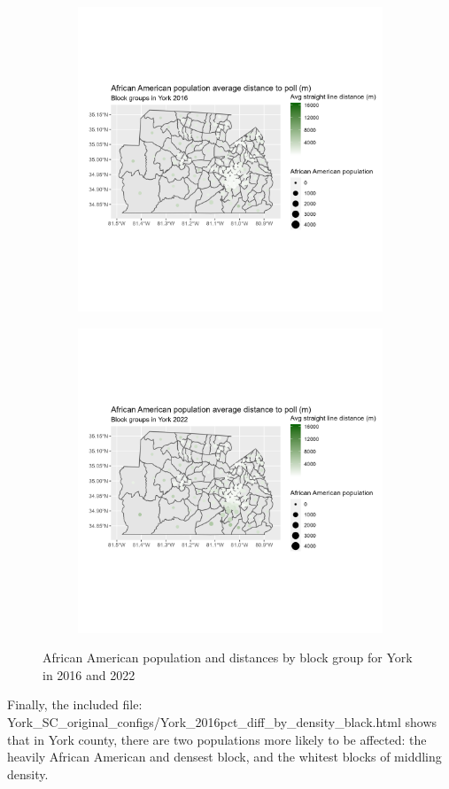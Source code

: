 \documentclass[11pt]{article}
\theoremstyle{remark}
\theoremstyle{definition}
\begin{document}
\begin{figure}
	\begin{subfigure}{.5\textwidth}
		\centering
		\includegraphics[width=\linewidth]{result_analysis/York_County_SC_original_configs/black_pop_and_dist_York_config_original_2016_polls.png}
		\label{sfig:York_2016_bg_dist_pop}
	\end{subfigure} 
	\begin{subfigure}{.5\textwidth}
		\centering
		\includegraphics[width=\linewidth]{result_analysis/York_County_SC_original_configs/black_pop_and_dist_York_config_original_2022_polls.png}
		\label{sfig:York_2022_bg_dist}
	\end{subfigure}
	\caption{African American population and distances by block group for York in 2016 and 2022}
	\label{fig:York distance Black population maps}
\end{figure}

Finally, the included file: \textrm{York\_SC\_original\_configs/York\_2016pct\_diff\_by\_density\_black.html} shows that in York county, there are two populations more likely to be affected: the heavily African American and densest block, and the whitest blocks of middling density. 
\end{document}
